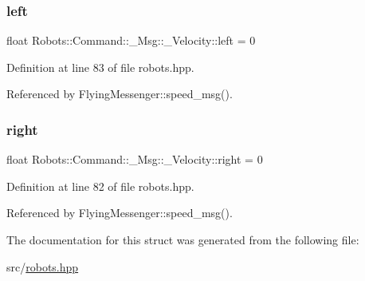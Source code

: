 \subsubsection{\texorpdfstring{left}{left}}
{\footnotesize\ttfamily float Robots\+::\+Command\+::\+\_\+\+Msg\+::\+\_\+\+Velocity\+::left = 0}



Definition at line 83 of file robots.\+hpp.



Referenced by Flying\+Messenger\+::speed\+\_\+msg().

\mbox{\label{struct_robots_1_1_command_1_1___msg_1_1___velocity_a2822c89acc2f922ebcae5bc18b76f95a}} 
\subsubsection{\texorpdfstring{right}{right}}
{\footnotesize\ttfamily float Robots\+::\+Command\+::\+\_\+\+Msg\+::\+\_\+\+Velocity\+::right = 0}



Definition at line 82 of file robots.\+hpp.



Referenced by Flying\+Messenger\+::speed\+\_\+msg().



The documentation for this struct was generated from the following file\+:\begin{DoxyCompactItemize}
\item 
src/\hyperlink{robots_8hpp}{robots.\+hpp}\end{DoxyCompactItemize}
